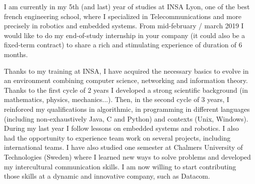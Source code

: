 \documentclass[11pt, a4paper]{awesome-cv}
\begin{document}
\makecvheader[R]


\makelettertitle

\begin{cvletter}

I am currently in my 5th (and last) year of studies at INSA Lyon, one of the best french engineering school, where I specialized in Telecommunications and more precisely in robotics and embedded systems. From mid-february / march 2019 I would like to do my end-of-study internship in your company (it could also be a fixed-term contract) to share a rich and stimulating experience of duration of 6 months. 

\vspace{2mm} %

Thanks to my training at INSA, I have acquired the necessary basics to evolve in an environment combining computer science, networking and information theory. Thanks to the first cycle of 2 years I developed a strong scientific background (in mathematics, physics, mechanics...). Then, in the second cycle of 3 years, I reinforced my qualifications in algorithmic, in programming in different languages (including non-exhaustively Java, C and Python) and contexts (Unix, Windows). During my last year I follow lessons on embedded systems and robotics. I also had the opportunity to experience team work on several projects, including international teams. I have also studied one semester at Chalmers University of Technologies (Sweden) where I learned new ways to solve problems and developed my intercultural communication skills. \newline 
I am now willing to start contributing those skills at a dynamic and innovative company, such as Datacom.%

\vspace{2mm} %




\end{cvletter}
\end{document}
